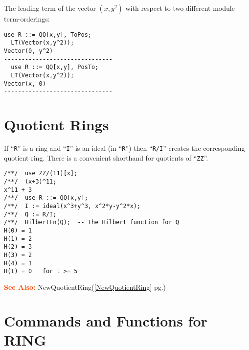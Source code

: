 \documentclass[a4paper]{mybook}
\newcommand\SeeAlso{\par\textcolor{OrangeRed}{\textbf{\large See Also: }}}
\begin{document}
The leading term of the vector $(x,y^2)$ with respect
to two different module term-orderings:
\begin{Verbatim}[label=example, rulecolor=\color{PineGreen}, frame=single]
  use R ::= QQ[x,y], ToPos;
  LT(Vector(x,y^2));
Vector(0, y^2)
-------------------------------
  use R ::= QQ[x,y], PosTo;
  LT(Vector(x,y^2));
Vector(x, 0)
-------------------------------
\end{Verbatim}



\section{Quotient Rings}
\label{Quotient Rings}

        
If ``\verb&R&'' is a ring and ``\verb&I&'' is an ideal (in ``\verb&R&'')
then ``\verb&R/I&'' creates the corresponding quotient ring.  There is
a convenient shorthand for quotients of ``\verb&ZZ&''.
\begin{Verbatim}[label=example, rulecolor=\color{PineGreen}, frame=single]
/**/  use ZZ/(11)[x];
/**/  (x+3)^11;
x^11 + 3
/**/  use R ::= QQ[x,y];
/**/  I := ideal(x^3+y^3, x^2*y-y^2*x);
/**/  Q := R/I;
/**/  HilbertFn(Q);  -- the Hilbert function for Q
H(0) = 1
H(1) = 2
H(2) = 3
H(3) = 2
H(4) = 1
H(t) = 0   for t >= 5
\end{Verbatim}


\SeeAlso %
  NewQuotientRing(\ref{NewQuotientRing} pg.\pageref{NewQuotientRing})

\section{Commands and Functions for RING}
\label{Commands and Functions for RING}

        
\end{document}
